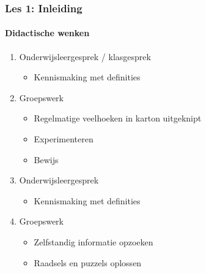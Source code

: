 \documentclass[dutch]{beamer}
\begin{document}
\begin{frame}
\frametitle{Les 1: Inleiding}
\framesubtitle{Didactische wenken}
\begin{enumerate}
	\item Onderwijsleergesprek / klasgesprek
	\begin{itemize}
	\item Kennismaking met definities
	\end{itemize}
	\item Groepswerk
	\begin{itemize}
	\item Regelmatige veelhoeken in karton uitgeknipt
	\item Experimenteren
	\item Bewijs
	\end{itemize}
  \item Onderwijsleergesprek
  \begin{itemize}
	\item Kennismaking met definities
	\end{itemize}
	\item Groepswerk
	\begin{itemize}
	\item Zelfstandig informatie opzoeken
	\item Raadsels en puzzels oplossen
	\end{itemize}
\end{enumerate}
\end{frame}
\end{document}

